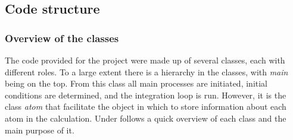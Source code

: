 


\subsection{Code structure}

\subsubsection{Overview of the classes}
The code provided for the project were made up of several classes, each with different roles. To a large extent there is a hierarchy in the classes, with  \textit{main} being on the top. From this class all main processes are initiated, initial conditions are determined, and the integration loop is run. However, it is the class \textit{atom} that facilitate the object in which to store information about each atom in the calculation. Under follows a quick overview of each class and the main purpose of it. 
		

